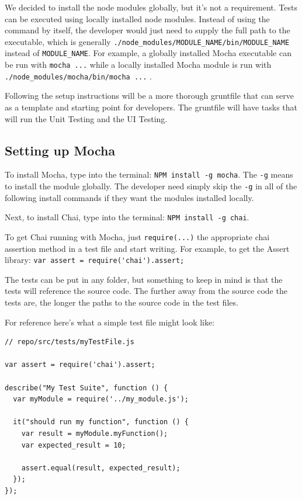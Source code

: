 \documentclass[12pt]{ucthesis}
\begin{document}
We decided to install the node modules globally, but it's not a requirement. Tests can be executed using locally installed node modules. Instead of using the command by itself, the developer would just need to supply the full path to the executable, which is generally \lstinline{./node_modules/MODULE_NAME/bin/MODULE_NAME} \space instead of \lstinline{MODULE_NAME}. For example, a globally installed Mocha executable can be run with \lstinline{mocha ...} while a locally installed Mocha module is run with \lstinline{./node_modules/mocha/bin/mocha ...} \space .

Following the setup instructions will be a more thorough gruntfile that can serve as a template and starting point for developers. The gruntfile will have tasks that will run the Unit Testing and the UI Testing.

\subsection{Setting up Mocha}
To install Mocha, type into the terminal: \lstinline{NPM install -g mocha}. The \lstinline{-g} means to install the module globally. The developer need simply skip the \lstinline{-g} in all of the following install commands if they want the modules installed locally.

Next, to install Chai, type into the terminal: \lstinline{NPM install -g chai}.

To get Chai running with Mocha, just \lstinline{require(...)} the appropriate chai assertion method in a test file and start writing. For example, to get the Assert library: \lstinline{var assert = require('chai').assert;}

The tests can be put in any folder, but something to keep in mind is that the tests will reference the source code. The further away from the source code the tests are, the longer the paths to the source code in the test files.

For reference here's what a simple test file might look like:
\begin{lstlisting}
// repo/src/tests/myTestFile.js

var assert = require('chai').assert;

describe("My Test Suite", function () {
  var myModule = require('../my_module.js');

  it("should run my function", function () {
    var result = myModule.myFunction();
    var expected_result = 10;

    assert.equal(result, expected_result);
  });
});
\end{lstlisting}
\end{document}
